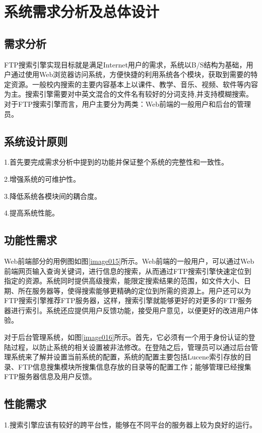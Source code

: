 
\chapter{系统需求分析及总体设计}
\section{需求分析}
FTP搜索引擎实现目标就是满足Internet用户的需求，系统以B/S结构为基础，用户通过使用Web浏览器访问系统，方便快捷的利用系统各个模块，获取到需要的特定资源。一般校内搜索的主要内容基本上以课件、教学、音乐、视频、软件等内容为主。搜索引擎需要对中英文混合的文件名有较好的分词支持,并支持模糊搜索。对于FTP搜索引擎而言，用户主要分为两类：Web前端的一般用户和后台的管理员。
\section{系统设计原则}
1.首先要完成需求分析中提到的功能并保证整个系统的完整性和一致性。

2.增强系统的可维护性。

3.降低系统各模块间的耦合度。

4.提高系统性能。
\section{功能性需求}
Web前端部分的用例图如图\ref{image015}所示。Web前端的一般用户，可以通过Web前端网页输入查询关键词，进行信息的搜索，从而通过FTP搜索引擎快速定位到指定的资源。系统同时提供高级搜索，能限定搜索结果的范围，如文件大小、日期、所在服务器等，使得搜索能够更精确的定位到所需的资源上。用户还可以为FTP搜索引擎推荐FTP服务器，这样，搜索引擎就能够更好的对更多的FTP服务器进行索引。系统还应提供用户反馈功能，接受用户意见，以便更好的改进用户体验。
\newpage
{}

对于后台管理系统，如图\ref{image016}所示。首先，它必须有一个用于身份认证的登陆过程，以防止系统的相关设置被非法修改。在登陆之后，管理员可以通过后台管理系统来了解并设置当前系统的配置，系统的配置主要包括Lucene索引存放的目录、FTP信息搜集模块所搜集信息存放的目录等的配置工作；能够管理已经搜集FTP服务器信息及用户反馈。


\section{性能需求}
1.搜索引擎应该有较好的跨平台性，能够在不同平台的服务器上较为良好的运行。

